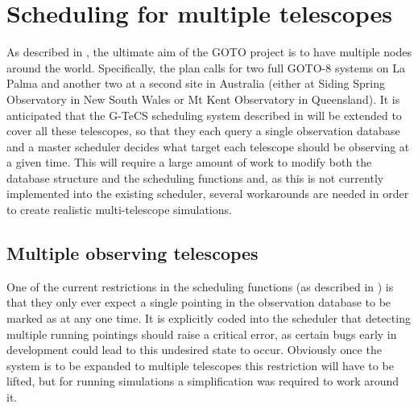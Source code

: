 \section{Scheduling for multiple telescopes}
\label{sec:multi_tel}
\begin{colsection}


\begin{colsection}

As described in , the ultimate aim of the GOTO project is to have multiple nodes around the world. Specifically, the plan calls for two full GOTO-8 systems on La Palma and another two at a second site in Australia (either at Siding Spring Observatory in New South Wales or Mt Kent Observatory in Queensland). It is anticipated that the G-TeCS scheduling system described in  will be extended to cover all these telescopes, so that they each query a single observation database and a master scheduler decides what target each telescope should be observing at a given time. This will require a large amount of work to modify both the database structure and the scheduling functions and, as this is not currently implemented into the existing scheduler, several workarounds are needed in order to create realistic multi-telescope simulations.

\end{colsection}


\subsection{Multiple observing telescopes}
\label{sec:multi_tel_scheduling}
\begin{colsection}

One of the current restrictions in the scheduling functions (as described in ) is that they only ever expect a single pointing in the observation database to be marked as  at any one time. It is explicitly coded into the scheduler that detecting multiple running pointings should raise a critical error, as certain bugs early in development could lead to this undesired state to occur. Obviously once the system is to be expanded to multiple telescopes this restriction will have to be lifted, but for running simulations a simplification was required to work around it.


\end{colsection}
\end{colsection}
